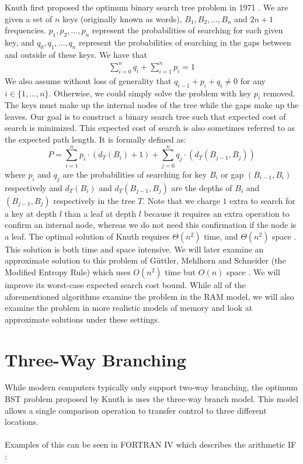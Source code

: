 \documentclass[letterpaper,12pt,titlepage,oneside,final]{book}
\theoremstyle{plain}
\begin{document}
Knuth first proposed the optimum binary search tree problem in 1971 \cite{knuth1971optimum}. We are given a set of $n$ keys (originally known as words), $B_1, B_2, ..., B_n$ and $2n+1$ frequencies. ${p_1, p_2, ..., p_n}$ represent the probabilities of searching for each given key, and ${q_0, q_1, ..., q_n}$ represent the probabilities of searching in the gaps between and outside of these keys. We have that
\begin{align*}
\sum\limits_{i=0}^n q_i + \sum\limits_{i=1}^n p_i = 1
 \end{align*}
We also assume without loss of generality that $q_{i-1}+p_i+q_i \neq 0$ for any $i \in \{1,...,n\}$. Otherwise, we could simply solve the problem with key $p_i$ removed. The keys must make up the internal nodes of the tree while the gaps make up the leaves. Our goal is to construct a binary search tree such that expected cost of search is minimized. This expected cost of search is also sometimes referred to as the expected path length. It is formally defined as: 
\begin{equation}\label{1.1}
P = \sum_{i=1}^{n} p_i \cdot (d_T(B_i)+1) + \sum_{j=0}^{n} q_j \cdot(d_T(B_{j-1}, B_j))
\end{equation}
where $p_i$ and $q_j$ are the probabilities of searching for key $B_i$ or gap $(B_{i-1}, B_i)$ respectively and $d_T(B_i)$ and $d_T(B_{j-1}, B_j)$ are the depths of $B_i$ and $(B_{j-1}, B_j)$ respectively in the tree $T$. Note that we charge $1$ extra to search for a key at depth $l$ than a leaf at depth $l$ because it requires an extra operation to confirm an internal node, whereas we do not need this confirmation if the node is a leaf. The optimal solution of Knuth requires $\Theta(n^2)$ time, and $\Theta(n^2)$ space \cite{knuth1971optimum}. This solution is both time and space intensive. We will later examine an approximate solution to this problem of G{\"u}ttler, Mehlhorn and Schneider (the Modified Entropy Rule) which uses $O(n^2)$ time but $O(n)$ space \cite{guttler1980binary}. We will improve its worst-case expected search cost bound. While all of the aforementioned algorithms examine the problem in the RAM model, we will also examine the problem in more realistic models of memory and look at approximate solutions under these settings.

\section{Three-Way Branching}


While modern computers typically only support two-way branching, the optimum BST problem proposed by Knuth is uses the three-way branch model. This model allows a single comparison operation to transfer control to three different locations. \\~\\ Examples of this can be seen in FORTRAN IV which describes the arithmetic IF \cite{Dock:228063}:
\end{document}
